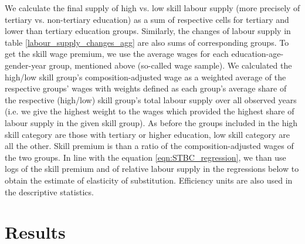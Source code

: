 \documentclass{article}
\begin{document}
We calculate the final supply of high vs. low skill labour supply (more precisely of tertiary vs. non-tertiary education) as a sum of respective cells for tertiary and lower than tertiary education groups. Similarly, the changes of labour supply in table \ref{labour_supply_changes_agg} are also sums of corresponding groups.
To get the skill wage premium, we use the average wages for each education-age-gender-year group, mentioned above (so-called wage sample). We calculated the high/low skill group's composition-adjusted wage as a weighted average of the respective groups' wages with weights defined as each group's average share of the respective (high/low) skill group's total labour supply over all observed years (i.e. we give the highest weight to the wages which provided the highest share of labour supply in the given skill group). As before the groups included in the high skill category are those with tertiary or higher education, low skill category are all the other. Skill premium is than a ratio of the composition-adjusted wages of the two groups. 
In line with the equation \ref{eqn:STBC_regression}, we than use logs of the skill premium and of relative labour supply in the regressions below to obtain the estimate of elasticity of substitution. Efficiency units are also used in the descriptive statistics.


\section{Results}
\end{document}
